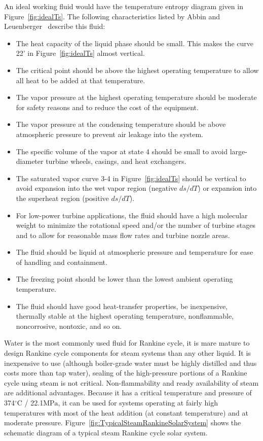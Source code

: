 An ideal working fluid would have the temperature entropy diagram given in Figure~\ref{fig:idealTs}. The following characteristics listed by Abbin and Leuenberger~\cite{Abbin1977} describe this fluid:
\begin{itemize}
  \item The heat capacity of the liquid phase should be small. This makes the curve 22' in Figure~\ref{fig:idealTs} almost vertical.
  \item The critical point should be above the highest operating temperature to allow all heat to be added at that temperature.
  \item The vapor pressure at the highest operating temperature should be moderate for safety reasons and to reduce the cost of the equipment.
  \item The vapor pressure at the condensing temperature should be above atmospheric pressure to prevent air leakage into the system.
  \item The specific volume of the vapor at state 4 should be small to avoid large-diameter turbine wheels, casings, and heat exchangers.
  \item The saturated vapor curve 3-4 in Figure~\ref{fig:idealTs} should be vertical to avoid expansion into the wet vapor region (negative $ds/dT$) or expansion into the superheat region (positive $ds/dT$).
  \item For low-power turbine applications, the fluid should have a high molecular weight to minimize the rotational speed and/or the number of turbine stages and to allow for reasonable mass flow rates and turbine nozzle areas.
  \item The fluid should be liquid at atmospheric pressure and temperature for ease of handling and containment.
  \item The freezing point should be lower than the lowest ambient operating temperature.
  \item The fluid should have good heat-transfer properties, be inexpensive, thermally stable at the highest operating temperature, nonflammable, noncorrosive, nontoxic, and so on.
\end{itemize}

Water is the most commonly used fluid for Rankine cycle, it is mare mature to design Rankine cycle components for steam systems than any other liquid. It is inexpensive to use (although boiler-grade water must be highly distilled and thus costs more than tap water), sealing of the high-pressure portions of a Rankine cycle using steam is not critical. Non-flammability and ready availability of steam are additional advantages. Because it has a critical temperature and pressure of 374$\mathrm{^\circ C}$ / 22.1$\mathrm{MPa}$, it can be used for systems operating at fairly high temperatures with most of the heat addition (at constant temperature) and at moderate pressure. Figure~\ref{fig:TypicalSteamRankineSolarSystem} shows the schematic diagram of a typical steam Rankine cycle solar system.

